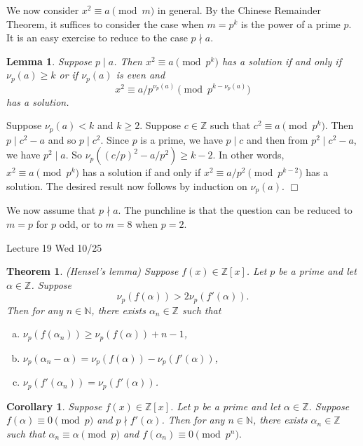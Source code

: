 \documentclass{article}
\def\Z{{\mathbb Z}}
\def\N{{\mathbb N}}
\def\Z{{\mathbb Z}}
\newtheorem{theorem}[subsection]{Theorem}
\newtheorem{cor}[subsection]{Corollary}
\newtheorem{lemma}[subsection]{Lemma}
\newenvironment{proof}{\noindent {\bf Proof:}}{$\Box$ \vspace{2 ex}}
\newcommand{\add}[1]{{\color{blue} #1}}
\begin{document}
We now consider $x^2 \equiv a\pmod{m}$ in general. By the Chinese Remainder Theorem, it suffices to consider the case when $m = p^k$ is the power of a prime $p$. It is an easy exercise to reduce to the case $p\nmid a$.

\begin{lemma}
    Suppose $p\mid a$. Then $x^2 \equiv a\pmod{p^k}$ has a solution if and only if $\nu_p(a)\geq k$ or if $\nu_p(a)$ is even and $$x^2\equiv a/p^{\nu_p(a)}\pmod{p^{k-\nu_p(a)}}$$ has a solution.
\end{lemma}

\begin{proof}
    Suppose $\nu_p(a) < k$ and $k\geq 2$. Suppose $c\in\Z$ such that $c^2\equiv a\pmod{p^k}$. Then $p\mid c^2 - a$ and so $p\mid c^2$. Since $p$ is a prime, we have $p\mid c$ and then from $p^2\mid c^2 - a$, we have $p^2\mid a$. So $\nu_p((c/p)^2 - a/p^2) \geq k - 2.$ In other words, $x^2\equiv a\pmod{p^k}$ has a solution if and only if $x^2\equiv a/p^2\pmod{p^{k-2}}$ has a solution. The desired result now follows by induction on $\nu_p(a)$.
\end{proof}

We now assume that $p\nmid a$. The punchline is that the question can be reduced to $m = p$ for $p$ odd, or to $m = 8$ when $p = 2$.

\begin{center}
    \add{Lecture 19 Wed 10/25}
\end{center}
\begin{theorem}\label{thm:hensel}
    (Hensel's lemma) Suppose $f(x)\in\Z[x]$. Let $p$ be a prime and let $\alpha\in \Z$. Suppose $$\nu_p(f(\alpha)) > 2\nu_p(f'(\alpha)).$$ Then for any $n\in\N$, there exists  $\alpha_n\in\Z$ such that
    \begin{enumerate}[(a)]
        \item $\nu_p(f(\alpha_n)) \geq \nu_p(f(\alpha)) + n-1$,
        \item $\nu_p(\alpha_n-\alpha) = \nu_p(f(\alpha))-\nu_p(f'(\alpha))$,
        \item $\nu_p(f'(\alpha_n)) = \nu_p(f'(\alpha))$.
    \end{enumerate} 
\end{theorem}

\begin{cor}
    Suppose $f(x)\in\Z[x]$. Let $p$ be a prime and let $\alpha\in \Z$. Suppose $f(\alpha)\equiv 0\pmod{p}$ and $p\nmid f'(\alpha)$. Then for any $n\in\N$, there exists $\alpha_n\in\Z$ such that $\alpha_n\equiv \alpha\pmod{p}$ and $f(\alpha_n)\equiv 0\pmod{p^n}.$
\end{cor}
\end{document}
